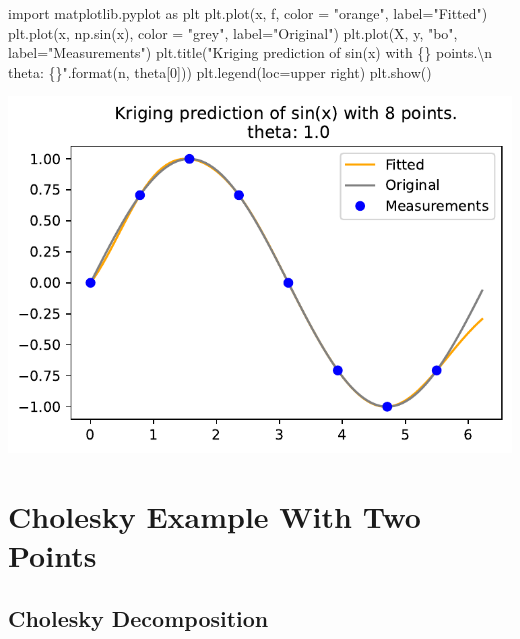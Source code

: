 \documentclass[
  letterpaper,
  DIV=11,
  numbers=noendperiod]{scrreprt}
\newenvironment{Shaded}{\begin{snugshade}}{\end{snugshade}}
\newcommand{\BuiltInTok}[1]{\textcolor[rgb]{0.00,0.23,0.31}{#1}}
\newcommand{\CharTok}[1]{\textcolor[rgb]{0.13,0.47,0.30}{#1}}
\newcommand{\DecValTok}[1]{\textcolor[rgb]{0.68,0.00,0.00}{#1}}
\newcommand{\ImportTok}[1]{\textcolor[rgb]{0.00,0.46,0.62}{#1}}
\newcommand{\NormalTok}[1]{\textcolor[rgb]{0.00,0.23,0.31}{#1}}
\newcommand{\OperatorTok}[1]{\textcolor[rgb]{0.37,0.37,0.37}{#1}}
\newcommand{\SpecialCharTok}[1]{\textcolor[rgb]{0.37,0.37,0.37}{#1}}
\newcommand{\StringTok}[1]{\textcolor[rgb]{0.13,0.47,0.30}{#1}}
\begin{document}
\begin{Shaded}
\begin{Highlighting}[]
\ImportTok{import}\NormalTok{ matplotlib.pyplot }\ImportTok{as}\NormalTok{ plt}
\NormalTok{plt.plot(x, f, color }\OperatorTok{=} \StringTok{"orange"}\NormalTok{, label}\OperatorTok{=}\StringTok{"Fitted"}\NormalTok{)}
\NormalTok{plt.plot(x, np.sin(x), color }\OperatorTok{=} \StringTok{"grey"}\NormalTok{, label}\OperatorTok{=}\StringTok{"Original"}\NormalTok{)}
\NormalTok{plt.plot(X, y, }\StringTok{"bo"}\NormalTok{, label}\OperatorTok{=}\StringTok{"Measurements"}\NormalTok{)}
\NormalTok{plt.title(}\StringTok{"Kriging prediction of sin(x) with }\SpecialCharTok{\{\}}\StringTok{ points.}\CharTok{\textbackslash{}n}\StringTok{ theta: }\SpecialCharTok{\{\}}\StringTok{"}\NormalTok{.}\BuiltInTok{format}\NormalTok{(n, theta[}\DecValTok{0}\NormalTok{]))}
\NormalTok{plt.legend(loc}\OperatorTok{=}\StringTok{\textquotesingle{}upper right\textquotesingle{}}\NormalTok{)}
\NormalTok{plt.show()}
\end{Highlighting}
\end{Shaded}

\includegraphics{006_num_gp_files/figure-pdf/cell-58-output-1.pdf}

\section{Cholesky Example With Two
Points}\label{cholesky-example-with-two-points}

\subsection{Cholesky Decomposition}\label{cholesky-decomposition}
\end{document}
